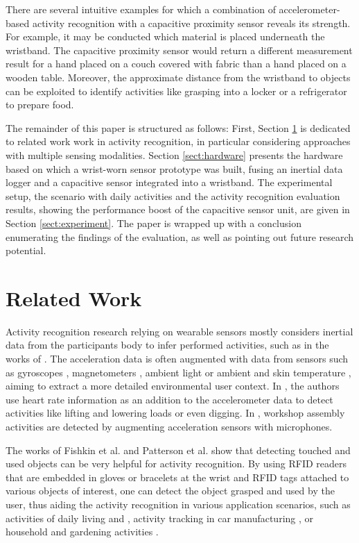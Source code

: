 \documentclass[runningheads,a4paper]{llncs}
\begin{document}
There are several intuitive examples for which a combination of accelerometer-based activity recognition with a capacitive proximity sensor reveals its strength. For example, it may be conducted which material is placed underneath the wristband. The capacitive proximity sensor would return a different measurement result for a hand placed on a couch covered with fabric than a hand placed on a wooden table. Moreover, the approximate distance from the wristband to objects can be exploited to identify activities like grasping into a locker or a refrigerator to prepare food.

The remainder of this paper is structured as follows: First, Section \ref{sect:related} is dedicated to related work work in activity recognition, in particular considering approaches with multiple sensing modalities. Section \ref{sect:hardware} presents the hardware based on which a wrist-worn sensor prototype was built, fusing an inertial data logger and a capacitive sensor integrated into a wristband.
The experimental setup, the scenario with daily activities and the activity recognition evaluation results, showing the performance boost of the capacitive sensor unit, are given in Section \ref{sect:experiment}. The paper is wrapped up with a conclusion enumerating the findings of the evaluation, as well as pointing out future research potential.

\section{Related Work}
\label{sect:related}

Activity recognition research relying on wearable sensors mostly considers inertial data from the participants body to infer performed activities, such as in the works of \cite{Ravi2005,Bao2004,Srinivasan2010,Amft2005}. The acceleration data is often augmented with data from sensors such as gyroscopes \cite{Holleczek_2010}, magnetometers \cite{Altun_2010}, ambient light \cite{Borazio2012} or ambient and skin temperature \cite{Krause_2003}, aiming to extract a more detailed environmental user context. In \cite{wyss2010recognition}, the authors use heart rate information as an addition to the accelerometer data to detect activities like lifting and lowering loads or even digging. In \cite{Ward_2006}, workshop assembly activities are detected by augmenting acceleration sensors with microphones.

The works of Fishkin et al. \cite{Fishkin_2005} and Patterson et al. \cite{patterson2005fga} show that detecting touched and used objects can be very helpful for activity recognition. By using RFID readers that are embedded in gloves or bracelets at the wrist and RFID tags attached to various objects of interest, one can detect the object grasped and used by the user, thus aiding the activity recognition in various application scenarios, such as activities of daily living \cite{phealth:maja} and \cite{Philipose_2004}, activity tracking in car manufacturing \cite{Stiefmeier08}, or household and gardening activities \cite{berlin_laerhoven_tei_2010}. 
\end{document}
